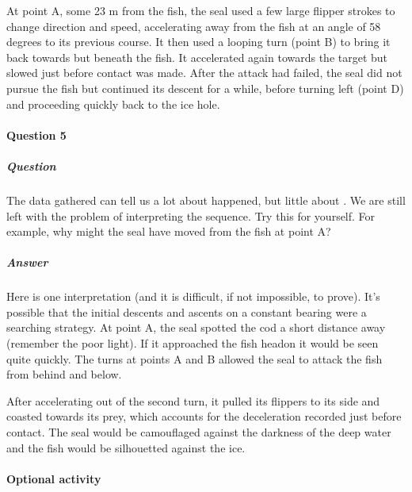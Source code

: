 \documentclass[letterpaper,10pt,english]{sphinxmanual}
\begin{document}
At point A, some 23 m from the fish, the seal used a few large flipper strokes to change direction and speed, accelerating away from the fish at an angle of 58 degrees to its previous course. It then used a looping turn (point B) to bring it back towards \textendash{} but beneath \textendash{} the fish. It accelerated again towards the target but slowed just before contact was made. After the attack had failed, the seal did not pursue the fish but continued its descent for a while, before turning left (point D) and
proceeding quickly back to the ice hole.


\paragraph{Question 5}
\label{\detokenize{content/session_00/Part_00_03:Question-5}}


\subparagraph{Question}
\label{\detokenize{content/session_00/Part_00_03:id3}}
The data gathered can tell us a lot about  happened, but little about . We are still left with the problem of interpreting the sequence. Try this for yourself. For example, why might the seal have moved  from the fish at point A?


\subparagraph{Answer}
\label{\detokenize{content/session_00/Part_00_03:id4}}
Here is one interpretation (and it is difficult, if not impossible, to prove). It’s possible that the initial descents and ascents on a constant bearing were a searching strategy. At point A, the seal spotted the cod a short distance away (remember the poor light). If it approached the fish head\sphinxhyphen{}on it would be seen quite quickly. The turns at points A and B allowed the seal to attack the fish from behind and below.

After accelerating out of the second turn, it pulled its flippers to its side and coasted towards its prey, which accounts for the deceleration recorded just before contact. The seal would be camouflaged against the darkness of the deep water and the fish would be silhouetted against the ice.


\paragraph{Optional activity}
\label{\detokenize{content/session_00/Part_00_03:Optional-activity}}
\end{document}
